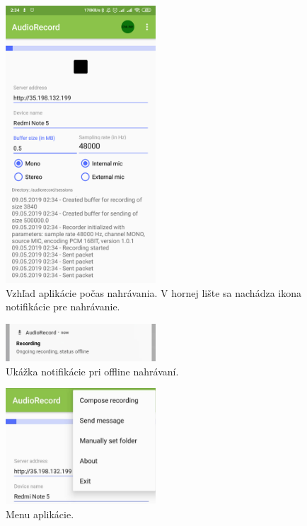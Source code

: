 \begin{figure}[hbt]
	\centering
	\includegraphics[width=0.5\textwidth]{obrazky-figures/ui.png}
	\caption{Vzhľad aplikácie počas nahrávania. V hornej lište sa nachádza ikona notifikácie pre nahrávanie.}
	\label{ui}
\end{figure}

\begin{figure}[hbt]
	\centering
	\includegraphics[width=0.5\textwidth]{obrazky-figures/notification.png}
	\caption{Ukážka notifikácie pri offline nahrávaní.}
	\label{notification}
\end{figure}

\begin{figure}[hbt]
	\centering
	\includegraphics[width=0.5\textwidth]{obrazky-figures/ui-menu.png}
	\caption{Menu aplikácie.}
	\label{ui-menu}
\end{figure}

